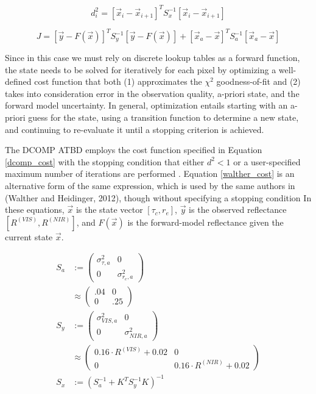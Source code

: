 \documentclass[12pt]{article}
\begin{document}
\begin{equation}\label{dcomp_cost}
    d^2_i = \left[\vec{x}_i-\vec{x}_{i+1}\right]^TS_x^{-1}\left[\vec{x}_i-\vec{x}_{i+1}\right]
\end{equation}

\begin{equation}\label{walther_cost}
    J = \left[\vec{y}-F(\vec{x})\right]^TS_y^{-1}\left[\vec{y}-F(\vec{x})\right] + \left[\vec{x}_a - \vec{x}\right]^T S_a^{-1} \left[\vec{x}_a - \vec{x}\right]
\end{equation}

Since in this case we must rely on discrete lookup tables as a forward function, the state needs to be solved for iteratively for each pixel by optimizing a well-defined cost function that both (1) approximates the $\chi^2$ goodness-of-fit and (2) takes into consideration error in the observation quality, a-priori state, and the forward model uncertainty. In general, optimization entails starting with an a-priori guess for the state, using a transition function to determine a new state, and continuing to re-evaluate it until a stopping criterion is achieved.

The DCOMP ATBD employs the cost function specified in Equation \ref{dcomp_cost} with the stopping condition that either $d^2 < 1$ or a user-specified maximum number of iterations are performed \cite{uw_algorithm_nodate}. Equation \ref{walther_cost} is an alternative form of the same expression, which is used by the same authors in (Walther and Heidinger, 2012), though without specifying a stopping condition \cite{walther_implementation_2012} In these equations, $\vec{x}$ is the state vector $[\tau_c, r_e]$, $\vec{y}$ is the observed reflectance $[R^{(VIS)}, R^{(NIR)}]$, and $F(\vec{x})$ is the forward-model reflectance given the current state $\vec{x}$.

\begin{equation}\label{err_mats}
    \begin{split}
        S_a &:= \begin{pmatrix}\sigma^2_{\tau, a} & 0 \\ 0 & \sigma^2_{r_e, a}\end{pmatrix} \\
            & \approx \begin{pmatrix} .04 & 0 \\ 0 & .25\end{pmatrix} \\
        S_y &:= \begin{pmatrix}\sigma^2_{VIS, a} & 0 \\ 0 & \sigma^2_{NIR, a}\end{pmatrix} \\
            &\approx \begin{pmatrix} 0.16\cdot R^{(VIS)}+0.02 & 0 \\ 0 & 0.16\cdot R^{(NIR)}+0.02\end{pmatrix} \\
        S_x &:= \left(S_a^{-1} + K^TS_y^{-1}K\right)^{-1}
    \end{split}
\end{equation}
\end{document}
